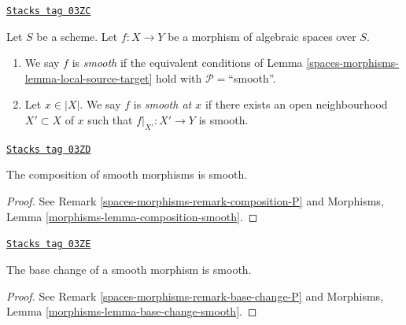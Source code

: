 \begin{definition}[Smooth]
\label{spaces-morphisms-definition-smooth}
\href{https://stacks.math.columbia.edu/tag/03ZC}{\texttt{Stacks tag 03ZC}}

Let $S$ be a scheme.
Let $f : X \to Y$ be a morphism of algebraic spaces over $S$.
\begin{enumerate}
\item We say $f$ is {\it smooth} if the equivalent conditions of
Lemma \ref{spaces-morphisms-lemma-local-source-target} hold with
$\mathcal{P} =$``smooth''.
\item Let $x \in |X|$. We say $f$ is {\it smooth at $x$} if there exists
an open neighbourhood $X' \subset X$ of $x$ such that $f|_{X'} : X' \to Y$
is smooth.
\end{enumerate}
\end{definition}

\begin{lemma}
\label{spaces-morphisms-lemma-composition-smooth}
\href{https://stacks.math.columbia.edu/tag/03ZD}{\texttt{Stacks tag 03ZD}}

The composition of smooth morphisms is smooth.
\end{lemma}

\begin{proof}
See Remark \ref{spaces-morphisms-remark-composition-P} and
Morphisms, Lemma \ref{morphisms-lemma-composition-smooth}.
\end{proof}

\begin{lemma}
\label{spaces-morphisms-lemma-base-change-smooth}
\href{https://stacks.math.columbia.edu/tag/03ZE}{\texttt{Stacks tag 03ZE}}

The base change of a smooth morphism is smooth.
\end{lemma}

\begin{proof}
See Remark \ref{spaces-morphisms-remark-base-change-P} and
Morphisms, Lemma \ref{morphisms-lemma-base-change-smooth}.
\end{proof}

